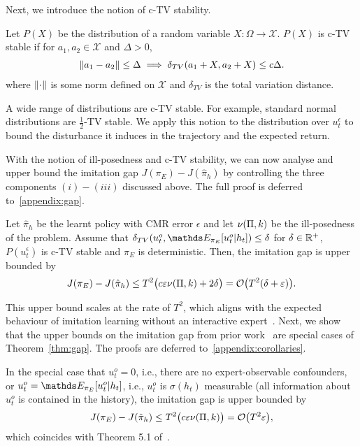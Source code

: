 Next, we introduce the notion of c-TV stability.
\begin{definition}
Let $P(X)$ be the distribution of a random variable $X:\Omega\rightarrow \mathcal{X}$. $P(X)$ is c-TV stable if for $a_1,a_2\in \mathcal{X}$ and $\Delta>0$,
\begin{align*}
\lVert a_1-a_2\rVert\leq\Delta \implies \delta_{TV}(a_1+X,a_2+X)\leq c\Delta.
\end{align*}
where $\lVert\cdot\rVert$ is some norm defined on $\mathcal{X}$ and $\delta_{TV}$ is the total variation distance.
\end{definition}
A wide range of distributions are c-TV stable. For example, standard normal distributions are $\frac{1}{2}$-TV stable. We apply this notion to the distribution over $u^\epsilon_t$ to bound the disturbance it induces in the trajectory and the expected return.

With the notion of ill-posedness and c-TV stability, we can now analyse and upper bound the imitation gap $J(\pi_E)-J(\hat{\pi}_h)$ by controlling the three components $(i)-(iii)$ discussed above. 
The full proof is deferred to~\cref{appendix:gap}.

\begin{theorem}\label{thm:gap}
Let $\hat{\pi}_h$ be the learnt policy with CMR error $\epsilon$ and let $\nu(\Pi,k)$ be the ill-posedness of the problem. Assume that $\delta_{TV}(u^o_t,\expectE_{\pi_E}[u^o_t\lvert h_t])\leq\delta$ for $\delta\in\mathbb{R}^+$, $P(u^\epsilon_t)$ is c-TV stable and $\pi_E$ is deterministic. Then, the imitation gap is upper bounded by 
\begin{align*}
    J(\pi_E)-J(\hat{\pi}_h)\leq T^2\big(c\varepsilon\nu(\Pi,k)+2\delta\big)=\mathcal{O}\big(T^2(\delta+\varepsilon)\big).
\end{align*}
\end{theorem}
This upper bound scales at the rate of $T^2$, which aligns with the expected behaviour of imitation learning without an interactive expert~\citep{Ross2010}.
Next, we show that the upper bounds on the imitation gap from prior work~\citep{Swamy2022_temporal, Swamy2022} are special cases of
Theorem~\ref{thm:gap}. The proofs are deferred to~\cref{appendix:corollaries}.
\begin{corollary}\label{corollary:noUo}
In the special case that $u^o_t = 0$, i.e., there are no expert-observable confounders, or $u^o_t=\expectE_{\pi_E}[u^o_t\lvert h_t]$, i.e., $u^o_t$ is $\sigma(h_t)$ measurable (all information about $u^o_t$ is contained in the history), the imitation gap is upper bounded by
\begin{align*}
    J(\pi_E)-J(\hat{\pi}_h)\leq T^2\big(c\varepsilon\nu(\Pi,k)\big)=\mathcal{O}\big(T^2\varepsilon\big),
\end{align*}
which coincides with Theorem 5.1 of~\citet{Swamy2022_temporal}.
\end{corollary}

